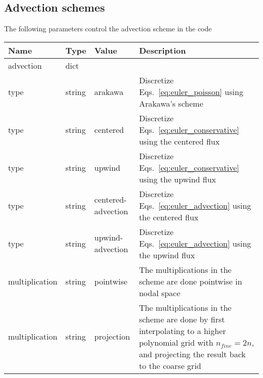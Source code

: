 \subsection{Advection schemes}
The following parameters control the advection scheme in the code
\begin{longtable}{lllp{7.5cm}}
\toprule
\rowcolor{gray!50}\textbf{Name} &  \textbf{Type} & \textbf{Value}  & \textbf{Description}  \\ \midrule
advection & dict & & \\
\qquad type  & string& arakawa & Discretize Eqs.~\eqref{eq:euler_poisson} using Arakawa's scheme \cite{Einkemmer2014} \\
\qquad type  & string& centered & Discretize Eqs.~\eqref{eq:euler_conservative} using the centered flux \\
\qquad type  & string& upwind & Discretize Eqs.~\eqref{eq:euler_conservative} using the upwind flux \\
\qquad type  & string& centered-advection & Discretize Eqs.~\eqref{eq:euler_advection} using the centered flux \\
\qquad type  & string& upwind-advection & Discretize Eqs.~\eqref{eq:euler_advection} using the upwind flux \\
\qquad multiplication    & string & pointwise & The multiplications in the scheme
are done pointwise in nodal space\\
\qquad multiplication    & string & projection & The multiplications in the scheme
are done by first interpolating to a higher polynomial grid with $n_{fine} = 2n$, and projecting the result back to the coarse grid\\
\bottomrule
\end{longtable}

